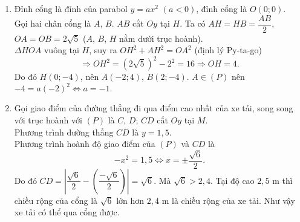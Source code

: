 \begin{bt}
{\begin{center}
		\end{center}
		\begin{enumerate}
			\item Đỉnh cổng là đỉnh của parabol $y=ax^2$ $(a<0)$, đỉnh cổng là $O(0;0)$.\\
			Gọi hai chân cổng là $A$, $B$. $AB$ cắt $Oy$ tại $H$. Ta có $AH=HB=\dfrac{AB}{2}$, $OA=OB=2\sqrt{5}$ ($A$, $B$, $H$ nằm dưới trục hoành).\\
			$\Delta HOA$ vuông tại $H$, suy ra $OH^2+AH^2=OA^2$ (định lý Py-ta-go) $$\Rightarrow OH^2=\left(2\sqrt{5}\right)^2-2^2=16\Rightarrow OH=4.$$
			Do đó $H(0;-4)$, nên $A(-2;4)$, $B(2;-4)$. $A\in(P)$ nên $-4=a(-2)^2\Leftrightarrow a=-1.$
			\item Gọi giao điểm của đường thẳng đi qua điểm cao nhất của xe tải, song song với trục hoành với $(P)$ là $C$, $D$; $CD$ cắt $Oy$ tại $M$.\\
			Phương trình đường thẳng $CD$ là $y=1{,}5$.\\
			Phương trình hoành độ giao điểm của $(P)$ và $CD$ là
			$$-x^2=1{,}5\Leftrightarrow x=\pm \dfrac{\sqrt{6}}{2}.$$
			Do đó $CD=\left|\dfrac{\sqrt{6}}{2}-\left(\dfrac{-\sqrt{6}}{2}\right)\right| = \sqrt{6}$. Mà $\sqrt{6}>2{,}4$. Tại độ cao $2{,}5$ m thì chiều rộng của cổng là $\sqrt{6}$ lớn hơn $2{,}4$ m là chiều rộng của xe tải. Như vậy xe tải có thể qua cổng được.
		\end{enumerate}
	}
\end{bt}

